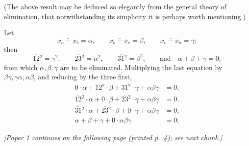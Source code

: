 \documentclass[11pt]{article}
\begin{document}
\medskip

(The above result may be deduced so elegantly from the general theory of elimination, that notwithstanding its simplicity it is perhaps worth mentioning.)

Let
\[
\overline{x_a - x_b} = \alpha,\qquad \overline{x_b - x_c} = \beta,\qquad \overline{x_c - x_a} = \gamma;
\]
then
\[
\overline{12}{}^2 = \gamma^2,\qquad \overline{23}{}^2 = \alpha^2,\qquad \overline{31}{}^2 = \beta^2,\qquad \text{and}\quad \alpha + \beta + \gamma = 0;
\]
from which $\alpha, \beta, \gamma$ are to be eliminated. Multiplying the last equation by $\beta\gamma, \gamma\alpha, \alpha\beta$, and reducing by the three first,
\[
\begin{aligned}
0\cdot\alpha + \overline{12}{}^2\cdot\beta + \overline{31}{}^2\cdot\gamma + \alpha\beta\gamma &= 0, \\
\overline{12}{}^2\cdot\alpha + 0\cdot\beta + \overline{23}{}^2\cdot\gamma + \alpha\beta\gamma &= 0, \\
\overline{31}{}^2\cdot\alpha + \overline{23}{}^2\cdot\beta + 0\cdot\gamma + \alpha\beta\gamma &= 0, \\
\alpha + \beta + \gamma + 0\cdot\alpha\beta\gamma &= 0;
\end{aligned}
\]

\textit{[Paper 1 continues on the following page (printed p.~4); see next chunk.]}
\end{document}
